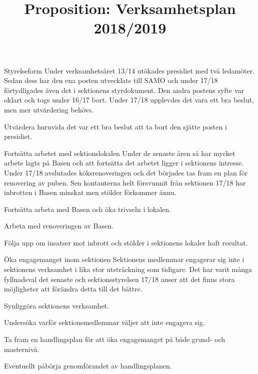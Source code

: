 \documentclass{dTeX-base}
\title{Proposition: Verksamhetsplan 2018/2019}
\author{}
\begin{document}
  \pagestyle{DTek}
  \maketitle

  \begin{FokusPunkt}{Styrelseform}{%
    Under verksamhetsåret 13/14 utökades presidiet med två ledamöter. Sedan
    dess har den ena posten utvecklats till SAMO och under 17/18 förtydligades
    även det i sektionens styrdokument. Den andra postens syfte var oklart och
    togs under 16/17 bort. Under 17/18 upplevdes det vara ett bra beslut, men
    mer utvärdering behövs.
  }
    \item Utvärdera huruvida det var ett bra beslut att ta bort den sjätte
      posten i presidiet.
  \end{FokusPunkt}

  \begin{FokusPunkt}{Fortsätta arbetet med sektionslokalen}{
    Under de senaste åren så har mycket arbete lagts på Basen och att fortsätta
    det arbetet ligger i sektionens intresse. Under 17/18 avslutades
    köksrenoveringen och det börjades tas fram en plan för renovering av puben.
    Sen kontanterna helt försvunnit från sektionen 17/18 har inbrotten i Basen
    minskat men stölder förkommer ännu.
  }
    \item Fortsätta arbeta med Basen och öka trivseln i lokalen.
    \item Arbeta med renoveringen av Basen.
    \item Följa upp om insatser mot inbrott och stölder i sektionens lokaler
      haft resultat.
  \end{FokusPunkt}

  \begin{FokusPunkt}{Öka engagemanget inom sektionen}{
    Sektionens medlemmar engagerar sig inte i sektionens verksamhet i lika stor
    utsträckning som tidigare. Det har varit många fyllnadsval det senaste och
    sektionsstyrelsen 17/18 anser att det finns stora möjligheter att förändra
    detta till det bättre.
  }
    \item Synliggöra sektionens verksamhet.
    \item Undersöka varför sektionsmedlemmar väljer att inte engagera sig.
    \item Ta fram en handlingsplan för att öka engagemanget på både grund- och
      masternivå.
    \item Eventuellt påbörja genomförandet av handlingsplanen.
  \end{FokusPunkt}
\end{document}
